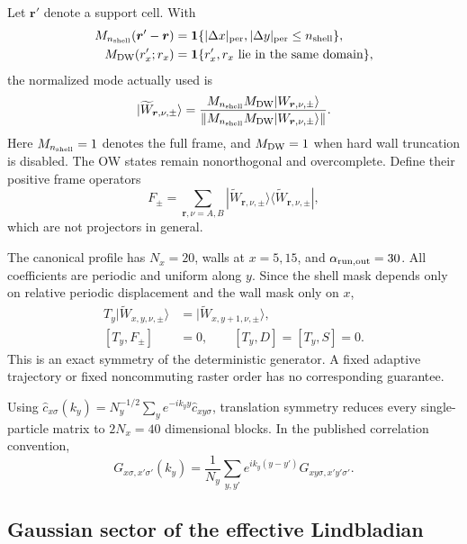 \documentclass[aps,prb,twocolumn,nofootinbib,superscriptaddress,floatfix]{revtex4-2}
\begin{document}
Let $\boldsymbol r'$ denote a support cell. With
\begin{align}
 M_{n_{\rm shell}}(\boldsymbol r'-\boldsymbol r)
 &=\mathbf{1}\{|\Delta x|_{\rm per},|\Delta y|_{\rm per}
 \le n_{\rm shell}\},\nonumber\\
 M_{\rm DW}(r'_x;r_x)&=\mathbf{1}\{r'_x,r_x
 \text{ lie in the same domain}\},
\end{align}
the normalized mode actually used is
\begin{equation}
 |\widetilde W_{\boldsymbol r,\nu,\pm}\rangle=
 \frac{M_{n_{\rm shell}}M_{\rm DW}
 |W_{\boldsymbol r,\nu,\pm}\rangle}
 {\|M_{n_{\rm shell}}M_{\rm DW}
 |W_{\boldsymbol r,\nu,\pm}\rangle\|}.
 \label{eq:truncatedmode}
\end{equation}
Here $M_{n_{\rm shell}}=1$ denotes the full frame, and $M_{\rm DW}=1$ when
hard wall truncation is disabled. The OW states remain nonorthogonal and
overcomplete. Define their positive frame operators
\begin{equation}
 F_\pm=\sum_{\boldsymbol r,\nu=A,B}
 |\widetilde W_{\boldsymbol r,\nu,\pm}\rangle
 \langle\widetilde W_{\boldsymbol r,\nu,\pm}|,
 \label{eq:frames}
\end{equation}
which are not projectors in general.

The canonical profile has $N_x=20$, walls at $x=5,15$, and
$\alpha_{\rm run,out}=30$. All coefficients are periodic and uniform along
$y$. Since the shell mask depends only on relative periodic displacement and
the wall mask only on $x$,
\begin{align}
 T_y|\widetilde W_{x,y,\nu,\pm}\rangle
 &=|\widetilde W_{x,y+1,\nu,\pm}\rangle,\nonumber\\
 [T_y,F_\pm]&=0,\qquad [T_y,D]=[T_y,S]=0.
 \label{eq:translation}
\end{align}
This is an exact symmetry of the deterministic generator. A fixed adaptive
trajectory or fixed noncommuting raster order has no corresponding guarantee.

Using
$\hat c_{x\sigma}(k_y)=N_y^{-1/2}\sum_y e^{-ik_y y}\hat c_{xy\sigma}$,
translation symmetry reduces every single-particle matrix to $2N_x=40$
dimensional blocks. In the published correlation convention,
\begin{equation}
 G_{x\sigma,x'\sigma'}(k_y)=\frac1{N_y}\sum_{y,y'}e^{ik_y(y-y')}
 G_{xy\sigma,x'y'\sigma'}.
 \label{eq:kyblock}
\end{equation}

\subsection{Gaussian sector of the effective Lindbladian}
\end{document}
